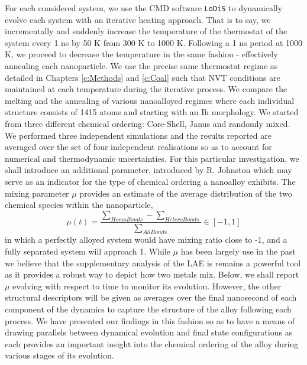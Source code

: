 For each considered system, we use the CMD software \texttt{LoDiS} \cite{LoDiS} to dynamically evolve each system with an iterative heating approach. That is to say, we incrementally and suddenly increase the temperature of the thermostat of the system every 1 ns by 50 K from 300 K to 1000 K. Following a 1 ns period at 1000 K, we proceed to decrease the temperature in the same fashion - effectively annealing each nanoparticle. We use the precise same thermostat regime as detailed in Chapters \ref{c:Methods} and \ref{c:Coal} such that NVT conditions are maintained at each temperature during the iterative process. We compare the melting and the annealing of various nanoalloyed regimes where each individual structure consists of 1415 atoms and starting with an Ih morphology. We started from three different chemical ordering: Core-Shell, Janus and randomly mixed. We performed three independent simulations and the results reported are averaged over the set of four independent realisations so as to account for numerical and thermodynamic uncertainties. 
For this particular investigation, we shall introduce an additional parameter, introduced by R. Johnston \cite{B204069G} which may serve as an indicator for the type of chemical ordering a nanoalloy exhibits. The mixing parameter $\mu$ provides an estimate of the average distribution of the two chemical species within the nanoparticle,
\begin{equation}
\mu\left( t \right) = \frac{ \sum_{Homo Bonds} - \sum_{Hetero Bonds} }{ \sum_{All Bonds} } \in [-1, 1 ] 
\label{eqn:mu}
\end{equation}
in which a perfectly alloyed system would have mixing ratio close to -1, and a fully  separated system will approach 1. While $\mu$ has been largely use in the past \cite{B204069G} we believe that the supplementary analysis of the LAE is remains a powerful tool as it provides a robust way to depict how two metals mix. Below, we shall report $\mu$ evolving with respect to time to monitor its evolution. However, the other structural descriptors will be given as averages over the final nanosecond of each component of the dynamics to capture the structure of the alloy following each process. We have presented our findings in this fashion so as to have a means of drawing parallels between dynamical evolution and final state configurations as each provides an important insight into the chemical ordering of the alloy during various stages of its evolution.


